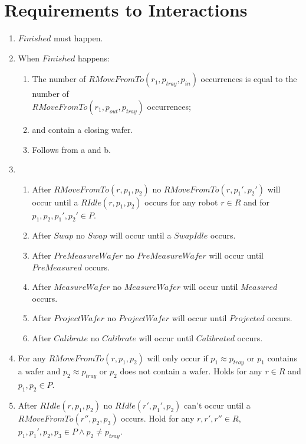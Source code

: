 \section{Requirements to Interactions}\label{sec:req2int}

\begin{enumerate}
    \item $\mathit{Finished}$ must happen.

    \item When $\mathit{Finished}$ happens:
    \begin{enumerate}
        \item The number of $\mathit{RMoveFromTo}(r_1, p_\mathit{tray}, p_\mathit{in})$ occurrences is equal to the number of \\$\mathit{RMoveFromTo}(r_1, p_\mathit{out}, p_\mathit{tray})$ occurrences;
        \item \chuckMeas and \chuckProj contain a closing wafer.
        \item Follows from a and b.
    \end{enumerate}

    \item \begin{enumerate}
        \item After $\mathit{RMoveFromTo}(r, p_1, p_2)$ no $\mathit{RMoveFromTo}(r, p_1', p_2')$ will occur until a $\mathit{RIdle}(r, p_1,p_2)$ occurs for any robot $r \in R$ and for $p_1, p_2, p_1',p_2' \in P$.
        \item After $\mathit{Swap}$ no $\mathit{Swap}$ will occur until a $\mathit{SwapIdle}$ occurs.
        \item After $\mathit{PreMeasureWafer}$ no $\mathit{PreMeasureWafer}$ will occur until $\mathit{PreMeasured}$ occurs.
        \item After $\mathit{MeasureWafer}$ no $\mathit{MeasureWafer}$ will occur until $\mathit{Measured}$ occurs.
        \item After $\mathit{ProjectWafer}$ no $\mathit{ProjectWafer}$ will occur until $\mathit{Projected}$ occurs.
        \item After $\mathit{Calibrate}$ no $\mathit{Calibrate}$ will occur until $\mathit{Calibrated}$ occurs.
    \end{enumerate}

    \item For any $RMoveFromTo(r, p_1, p_2)$ will only occur if $p_1 \approx p_\mathit{tray}$ or $p_1$ contains a wafer and $p_2 \approx p_\mathit{tray}$ or $p_2$ does not contain a wafer. Holds for any $r \in R$ and $p_1,p_2 \in P$.
    \item After $RIdle(r, p_1, p_2)$ no $RIdle(r', p_1', p_2)$ can't occur until a $RMoveFromTo(r'',p_2,p_3)$ occurs. Hold for any $r, r',r''\in R$, $p_1,p_1',p_2,p_3 \in P \wedge p_2 \neq p_\mathit{tray}$.


\end{enumerate}
